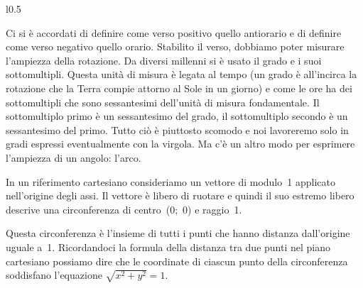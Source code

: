 \begin{wrapfigure}{l}{0.5\textwidth} 
 \vspace{-6pt}
  \begin{minipage}{.3\textwidth}
  \begin{center}
\begin{inaccessibleblock}
    
\end{inaccessibleblock}
  \end{center}
  \end{minipage}
   \vspace{-12pt}
  \vspace{1pt}
\end{wrapfigure} 
 
Ci si è accordati di definire come verso positivo quello antiorario e di 
definire come verso negativo quello orario.
Stabilito il verso, dobbiamo poter misurare l'ampiezza della rotazione. 
Da diversi millenni si è usato il grado e i suoi sottomultipli. 
Questa unità di misura è legata al tempo (un grado è all'incirca la rotazione 
che la Terra compie attorno al Sole in un giorno) e come le ore ha dei 
sottomultipli che sono sessantesimi dell'unità di misura fondamentale. 
Il sottomultiplo primo è un sessantesimo del grado, il sottomultiplo secondo 
è un sessantesimo del primo. 
Tutto ciò è piuttosto scomodo e noi lavoreremo solo in gradi espressi 
eventualmente con la virgola. Ma c'è un altro modo per esprimere l'ampiezza 
di un angolo: l'arco. 

In un riferimento cartesiano consideriamo un vettore di modulo~1 applicato
nell'origine degli assi. 
Il vettore è libero di ruotare e quindi il suo estremo 
libero descrive una circonferenza di centro~(0;~0) e raggio~1. 

Questa circonferenza è l'insieme di tutti i punti che hanno distanza 
dall'origine uguale a~1. Ricordandoci la formula della distanza tra due punti
nel piano cartesiano possiamo dire che le coordinate di ciascun punto della 
circonferenza soddisfano l'equazione \(\sqrt{x^2 + y^2} = 1\).

\providecommand*\wideparen[1]{
  \setbox254\hbox{\(#1\)}
  \dimen0=\wd254\relax
  \setbox254\hbox{\rotatebox{-90}{(}}
  \vbox{
    \ialign{
     ##\crcr
     \resizebox{\dimen0}{!}{\box254}\crcr
     \(\hfil\displaystyle{#1}\hfil\)\crcr
    }
  }
}

